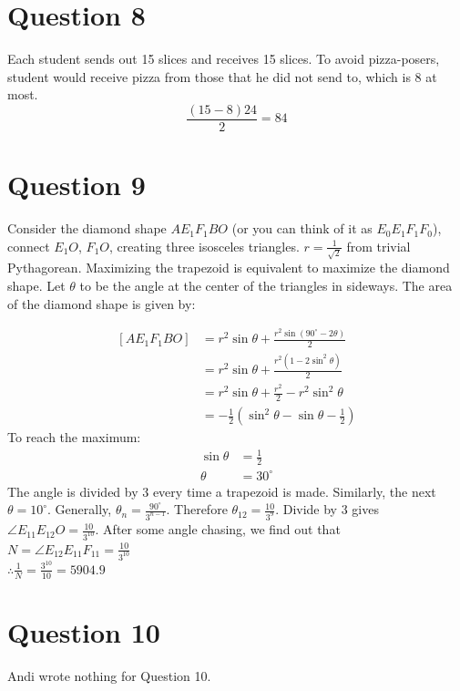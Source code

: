 \documentclass{article}
\begin{document}
\section*{Question 8}
Each student sends out 15 slices and receives 15 slices. To avoid pizza-posers, student would receive pizza from those that he did not send to, which is 8 at most. 
\[\frac{(15-8) 24}{2}=\boxed{84}\]



\pagebreak
\section*{Question 9}
Consider the diamond shape $AE_1F_1BO$ (or you can think of it as $E_0E_1F_1F_0$), connect $E_1O$, $F_1O$, creating three isosceles triangles. $r=\frac{1}{\sqrt 2}$ from trivial Pythagorean. Maximizing the trapezoid is equivalent to maximize the diamond shape. Let $\theta$ to be the angle at the center of the triangles in sideways. The area of the diamond shape is given by:

\begin{align*}
    \left[AE_1F_1BO\right]&=r^2\sin\theta+\frac{r^2\sin\left(90^\circ-2\theta\right)}{2}\\
    &=r^2\sin\theta+\frac{r^2\left(1-2\sin^2\theta\right)}{2}\\
    &=r^2\sin\theta+\frac{r^2}{2}-r^2\sin^2\theta\\
    &=-\frac 12\left(\sin^2\theta-\sin\theta-\frac 12\right)
\end{align*}
To reach the maximum:
\begin{align*}
    \sin\theta&=\frac 12\\
    \theta&=30^\circ
\end{align*}
The angle is divided by 3 every time a trapezoid is made. Similarly, the next $\theta=10^\circ$. Generally, $\theta_n=\frac{90^\circ}{3^{n-1}}$. Therefore $\theta_{12}=\frac{10}{3^9}$. Divide by 3 gives $\angle E_{11}E_{12}O=\frac{10}{3^{10}}$. After some angle chasing, we find out that $N=\angle E_{12}E_{11}F_{11}=\frac{10}{3^{10}}$\\
$\therefore \frac 1N=\frac{3^{10}}{10}=\boxed{5904.9}$

\section*{Question 10}
Andi wrote nothing for Question 10.
\end{document}
